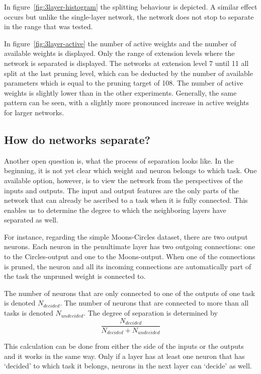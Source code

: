 In figure~\ref{fig:3layer-histogram} the splitting behaviour is depicted.
A similar effect occurs but unlike the single-layer network, the network does not stop to separate in the range that was tested. 

In figure~\ref{fig:3layer-active} the number of active weights and the number of available weights is displayed.
Only the range of extension levels where the network is separated is displayed.
The networks at extension level 7 until 11 all split at the last pruning level, which can be deducted by the number of available parameters which is equal to the pruning target of 108.
The number of active weights is slightly lower than in the other experiments.
Generally, the same pattern can be seen, with a slightly more pronounced increase in active weights for larger networks.

\subsection{How do networks separate?}
Another open question is, what the process of separation looks like.
In the beginning, it is not yet clear which weight and neuron belongs to which task.
One available option, however, is to view the network from the perspectives of the inputs and outputs.
The input and output features are the only parts of the network that can already be ascribed to a task when it is fully connected.
This enables us to determine the degree to which the neighboring layers have separated as well.

For instance, regarding the simple Moons-Circles dataset, there are two output neurons.
Each neuron in the penultimate layer has two outgoing connections: one to the Circles-output and one to the Moons-output.
When one of the connections is pruned, the neuron and all its incoming connections are automatically part of the task the unpruned weight is connected to.

The number of neurons that are only connected to one of the outputs of one task is denoted $N_{decided}$.
The number of neurons that are connected to more than all tasks is denoted $N_{undecided}$.
The degree of separation is determined by 
\[
\frac{N_{decided}}{N_{decided}+N_{undecided}}
\]

This calculation can be done from either the side of the inputs or the outputs and it works in the same way.
Only if a layer has at least one neuron that has `decided' to which task it belongs, neurons in the next layer can `decide' as well.

